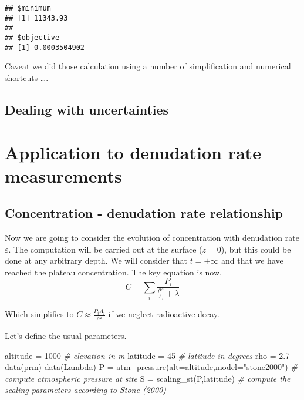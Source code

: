 \documentclass[
]{book}
\newenvironment{Shaded}{\begin{snugshade}}{\end{snugshade}}
\newcommand{\AttributeTok}[1]{\textcolor[rgb]{0.77,0.63,0.00}{#1}}
\newcommand{\CommentTok}[1]{\textcolor[rgb]{0.56,0.35,0.01}{\textit{#1}}}
\newcommand{\DecValTok}[1]{\textcolor[rgb]{0.00,0.00,0.81}{#1}}
\newcommand{\FloatTok}[1]{\textcolor[rgb]{0.00,0.00,0.81}{#1}}
\newcommand{\FunctionTok}[1]{\textcolor[rgb]{0.00,0.00,0.00}{#1}}
\newcommand{\NormalTok}[1]{#1}
\newcommand{\OtherTok}[1]{\textcolor[rgb]{0.56,0.35,0.01}{#1}}
\newcommand{\StringTok}[1]{\textcolor[rgb]{0.31,0.60,0.02}{#1}}
\begin{document}
\begin{verbatim}
## $minimum
## [1] 11343.93
## 
## $objective
## [1] 0.0003504902
\end{verbatim}

Caveat we did those calculation using a number of simplification and numerical shortcuts \ldots.

\hypertarget{dealing-with-uncertainties}{%
\section{Dealing with uncertainties}\label{dealing-with-uncertainties}}

\hypertarget{application-to-denudation-rate-measurements}{%
\chapter{Application to denudation rate measurements}\label{application-to-denudation-rate-measurements}}

\hypertarget{concentration---denudation-rate-relationship}{%
\section{Concentration - denudation rate relationship}\label{concentration---denudation-rate-relationship}}

Now we are going to consider the evolution of concentration with denudation rate \(\varepsilon\).
The computation will be carried out at the surface (\(z=0\)), but this could be done at any arbitrary depth.
We will consider that \(t=+\infty\) and that we have reached the plateau concentration.
The key equation is now,
\[C=\sum_i \frac{P_i}{\frac{\rho \varepsilon}{\Lambda_i}+\lambda}\]

Which simplifies to \(C\approx\frac{P_i \Lambda_i}{\rho \varepsilon}\) if we neglect radioactive decay.

Let's define the usual parameters.

\begin{Shaded}
\begin{Highlighting}[]
\NormalTok{altitude }\OtherTok{=} \DecValTok{1000} \CommentTok{\# elevation in m}
\NormalTok{latitude }\OtherTok{=} \DecValTok{45} \CommentTok{\# latitude in degrees}
\NormalTok{rho }\OtherTok{=} \FloatTok{2.7}
\FunctionTok{data}\NormalTok{(prm)}
\FunctionTok{data}\NormalTok{(Lambda)}
\NormalTok{P }\OtherTok{=} \FunctionTok{atm\_pressure}\NormalTok{(}\AttributeTok{alt=}\NormalTok{altitude,}\AttributeTok{model=}\StringTok{"stone2000"}\NormalTok{) }\CommentTok{\# compute atmospheric pressure at site}
\NormalTok{S }\OtherTok{=} \FunctionTok{scaling\_st}\NormalTok{(P,latitude) }\CommentTok{\# compute the scaling parameters according to Stone (2000)}
\end{Highlighting}
\end{Shaded}
\end{document}
